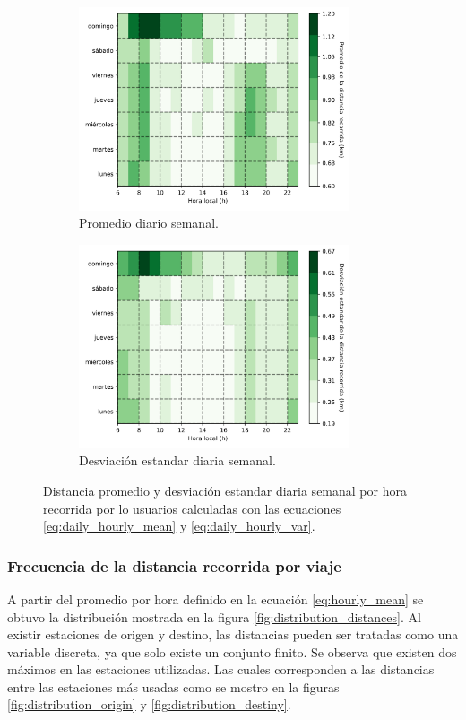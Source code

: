 \begin{figure}[H]
    \centering
    \begin{subfigure}[b]{8cm}
        \includegraphics[width=8cm]{Graphics/daily_hourly_mean_distance.png}
        \caption{Promedio diario semanal.}
        \label{fig:daily_hourly_mean_distance}
    \end{subfigure}
    \begin{subfigure}[b]{8cm}
        \includegraphics[width=8cm]{Graphics/daily_hourly_var_distance.png}
        \caption{Desviación estandar diaria semanal.}
        \label{fig:daily_hourly_var_distance}
    \end{subfigure}
    \caption{Distancia promedio y desviación estandar diaria semanal por hora recorrida por lo usuarios calculadas con las ecuaciones \ref{eq:daily_hourly_mean} y \ref{eq:daily_hourly_var}.}
    \label{fig:daily_hourly_distance}
\end{figure}

\subsubsection{Frecuencia de la distancia recorrida por viaje}

A partir del promedio por hora definido en la ecuación \ref{eq:hourly_mean} se obtuvo la distribución mostrada en la figura \ref{fig:distribution_distances}. Al existir estaciones de origen y destino, las distancias pueden ser tratadas como una variable discreta, ya que solo existe un conjunto finito. Se observa que existen dos máximos en las estaciones utilizadas. Las cuales corresponden a las distancias entre las estaciones más usadas como se mostro en la figuras \ref{fig:distribution_origin} y \ref{fig:distribution_destiny}.

